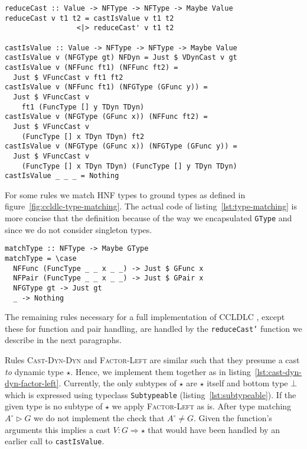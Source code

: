 \begin{lstlisting}[float,
  caption=Rule \textsc{Cast-Is-Value} (\texttt{Interpreter.hs}),
  label=lst:cast-is-value]
reduceCast :: Value -> NFType -> NFType -> Maybe Value
reduceCast v t1 t2 = castIsValue v t1 t2
                 <|> reduceCast' v t1 t2

castIsValue :: Value -> NFType -> NFType -> Maybe Value
castIsValue v (NFGType gt) NFDyn = Just $ VDynCast v gt
castIsValue v (NFFunc ft1) (NFFunc ft2) =
  Just $ VFuncCast v ft1 ft2
castIsValue v (NFFunc ft1) (NFGType (GFunc y)) =
  Just $ VFuncCast v
    ft1 (FuncType [] y TDyn TDyn)
castIsValue v (NFGType (GFunc x)) (NFFunc ft2) =
  Just $ VFuncCast v
    (FuncType [] x TDyn TDyn) ft2
castIsValue v (NFGType (GFunc x)) (NFGType (GFunc y)) =
  Just $ VFuncCast v
    (FuncType [] x TDyn TDyn) (FuncType [] y TDyn TDyn)
castIsValue _ _ _ = Nothing
\end{lstlisting}

For some rules we match HNF types to ground types as defined in figure~\ref{fig:ccldlc-type-matching}. The actual code of listing~\ref{lst:type-matching} is more concise that the definition because of the way we encapsulated \texttt{GType} and since we do not consider singleton types.

\begin{lstlisting}[float,
  caption=Type matching $A^\circ \rhd G$ (\texttt{Interpreter.hs}),
  label=lst:type-matching]
matchType :: NFType -> Maybe GType
matchType = \case
  NFFunc (FuncType _ _ x _ _) -> Just $ GFunc x
  NFPair (FuncType _ _ x _ _) -> Just $ GPair x
  NFGType gt -> Just gt
  _ -> Nothing
\end{lstlisting}

The remaining rules necessary for a full implementation of CCLDLC , except these for function and pair handling, are handled by the \texttt{reduceCast'} function we describe in the next paragraphs.

Rules \textsc{Cast-Dyn-Dyn} and \textsc{Factor-Left} are similar such that they presume a cast \emph{to} dynamic type $\star$. Hence, we implement them together as in listing~\ref{lst:cast-dyn-dyn-factor-left}. Currently, the only subtypes of $\star$ are $\star$ itself and bottom type $\bot$ which is expressed using typeclass \texttt{Subtypeable} (listing~\ref{lst:subtypeable}). If the given type is no subtype of $\star$ we apply \textsc{Factor-Left} as is. After type matching $A^\circ \rhd G$ we do not implement the check that $A^\circ \neq G$. Given the function's arguments this implies a cast $V : G \Rightarrow \star$ that would have been handled by an earlier call to \texttt{castIsValue}.

